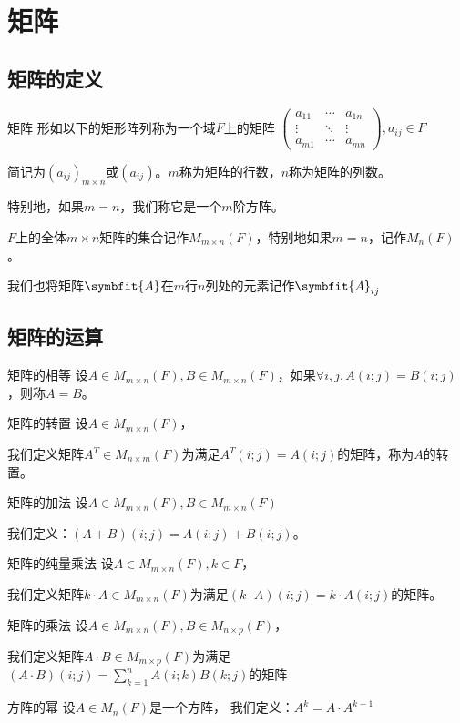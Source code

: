 \documentclass[12pt, a4paper, oneside, UTF8]{ctexbook}
\begin{document}
	\section{矩阵}
		\subsection{矩阵的定义}
			\begin{defn}{矩阵}{}
				形如以下的矩形阵列称为一个域$F$上的矩阵
				$\begin{pmatrix}
					a_{11} & \cdots & a_{1n} \\
					\vdots & \ddots & \vdots \\
					a_{m1} & \cdots & a_{mn}
				\end{pmatrix},a_{ij} \in F$

				简记为$(a_{ij})_{m \times n}$或$(a_{ij})$。$m$称为矩阵的行数，$n$称为矩阵的列数。

				特别地，如果$m=n$，我们称它是一个$m$阶方阵。

				$F$上的全体$m \times n$矩阵的集合记作$M_{m \times n} (F)$，特别地如果$m=n$，记作$M_n (F)$。

				我们也将矩阵$\symbfit{A}$在$m$行$n$列处的元素记作$\symbfit{A}_{ij}$
			\end{defn}
		\subsection{矩阵的运算}
		\begin{para}{0}
			    \begin{defn}{矩阵的相等}{}
				    设$A\in M_{m\times n}(F),B\in M_{m \times n}(F)$，如果$\forall i,j,A(i;j)=B(i;j)$，则称$A=B$。
				\end{defn}
				\begin{defn}{矩阵的转置}{}
				    设$A\in M_{m \times n}(F)$，
					
					我们定义矩阵$A^T \in M_{n \times m}(F)$为满足$A^T(i;j)=A(i;j)$的矩阵，称为$A$的转置。
				\end{defn}
				\begin{defn}{矩阵的加法}{}
				    设$A\in M_{m \times n}(F),B\in M_{m \times n}(F)$
					
					我们定义：$(A+B)(i;j)=A(i;j)+B(i;j)$。
				\end{defn}
				\begin{defn}{矩阵的纯量乘法}{}
				    设$A\in M_{m \times n}(F),k \in F$，
					
					我们定义矩阵$k\cdot A \in M_{m\times n}(F)$为满足$(k\cdot  A)(i;j)=k\cdot A(i;j)$的矩阵。
				\end{defn}
				\begin{defn}{矩阵的乘法}{}
				    设$A\in M_{m\times n}(F),B\in M_{n \times p}(F)$，
					
					我们定义矩阵$A\cdot B \in M_{m\times p}(F)$为满足$(A\cdot B)(i;j)=\sum_{k=1}^n A(i;k)B(k;j)$的矩阵
				\end{defn}
				\begin{defn}{方阵的幂}{}
					设$A \in M_n (F)$是一个方阵，
					我们定义：$A^k=A\cdot A^{k-1}$
				\end{defn}
		\end{para}
\end{document}

